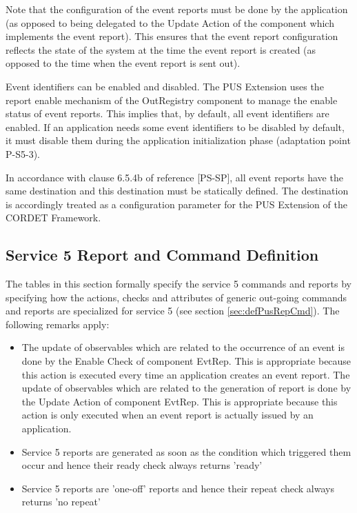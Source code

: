 \documentclass{pnp_article}
\begin{document}
Note that the configuration of the event reports must be done by the application (as opposed to being delegated to the Update Action of the component which implements the event report). This ensures that the event report configuration reflects the state of the system at the time the event report is created (as opposed to the time when the event report is sent out).  

Event identifiers can be enabled and disabled. The PUS Extension uses the report enable mechanism of the OutRegistry component to manage the enable status of event reports. This implies that, by default, all event identifiers are enabled. If an application needs some event identifiers to be disabled by default, it must disable them during the application initialization phase (adaptation point P-S5-3).

In accordance with clause 6.5.4b of reference [PS-SP], all event reports have the same destination and this destination must be statically defined. The destination is accordingly treated as a configuration parameter for the PUS Extension of the CORDET Framework.

\subsection{Service 5 Report and Command Definition}\label{sec:serv5RepCmdDef}
The tables in this section formally specify the service 5 commands and reports by specifying how the actions, checks and attributes of generic out-going commands and reports are specialized for service 5 (see section \ref{sec:defPusRepCmd}). The following remarks apply:

\begin{itemize}
\item The update of observables which are related to the occurrence of an event is done by the Enable Check of component EvtRep. This is appropriate because this action is executed every time an application creates an event report. The update of observables which are related to the generation of report is done by the Update Action of component EvtRep. This is appropriate because this action is only executed when an event report is actually issued by an application.
\item Service 5 reports are generated as soon as the condition which triggered them occur and hence their ready check always returns 'ready'
\item Service 5 reports are 'one-off' reports and hence their repeat check always returns 'no repeat'
\end{itemize}
\end{document}

